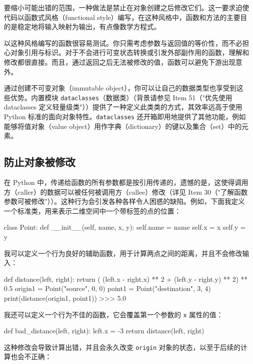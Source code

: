 要缩小可能出错的范围，一种做法是禁止在对象创建之后修改它们。这一要求迫使代码以函数式风格（functional style）编写，在这种风格中，函数和方法的主要目的是稳定地将输入映射为输出，有点像数学方程式。

以这种风格编写的函数很容易测试。你只需考虑参数与返回值的等价性，而不必担心对象引用与标识。对于不会进行可变状态转换或引发外部副作用的函数，理解和修改都很直接。而且，通过返回之后无法被修改的值，函数可以避免下游出现意外。

通过创建不可变对象（immutable object），你可以让自己的数据类型也享受到这些优势。内置模块 \texttt{dataclasses}（数据类）（背景请参见 Item 51（"优先使用 dataclasses 定义轻量级类"））提供了一种定义此类类的方式，其效率远高于使用 Python 标准的面向对象特性。\texttt{dataclasses} 还开箱即用地提供了其他功能，例如能够将值对象（value object）用作字典（dictionary）的键以及集合（set）中的元素。

\subsection{防止对象被修改}

在 Python 中，传递给函数的所有参数都是按引用传递的，遗憾的是，这使得调用方（caller）的数据可以被任何被调用方（callee）修改（详见 Item 30（"了解函数参数可被修改"））。这种行为会引发各种各样令人困惑的缺陷。例如，下面我定义一个标准类，用来表示二维空间中一个带标签的点的位置：

\begin{codebox}[python]
class Point:
    def __init__(self, name, x, y):
        self.name = name
        self.x = x
        self.y = y
\end{codebox}

我可以定义一个行为良好的辅助函数，用于计算两点之间的距离，并且不会修改输入：

\begin{codebox}[python]
def distance(left, right):
    return ( (left.x - right.x) ** 2 +
(left.y - right.y) ** 2) ** 0.5
origin1 = Point("source", 0, 0)
point1 = Point("destination", 3, 4)
print(distance(origin1, point1))
>>>
5.0
\end{codebox}

我还可以定义一个行为不佳的函数，它会覆盖第一个参数的 \texttt{x} 属性的值：

\begin{codebox}[python]
def bad_distance(left, right):
    left.x = -3
    return distance(left, right)
\end{codebox}

这种修改会导致计算出错，并且会永久改变 \texttt{origin} 对象的状态，以至于后续的计算也会不正确：


